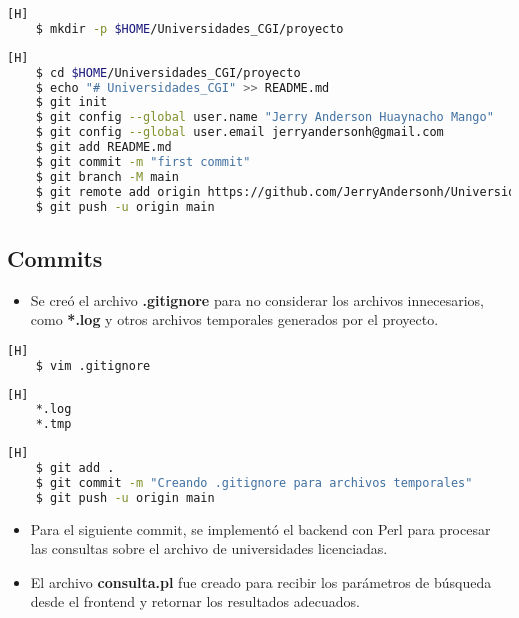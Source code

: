 \documentclass{article}
\begin{document}
    \begin{lstlisting}[language=bash,caption={Creando directorio para el proyecto GitHub}][H]
    $ mkdir -p $HOME/Universidades_CGI/proyecto
    \end{lstlisting}
    
    \begin{lstlisting}[language=bash,caption={Inicializando directorio para el repositorio GitHub}][H]
    $ cd $HOME/Universidades_CGI/proyecto
    $ echo "# Universidades_CGI" >> README.md
    $ git init
    $ git config --global user.name "Jerry Anderson Huaynacho Mango"
    $ git config --global user.email jerryandersonh@gmail.com
    $ git add README.md
    $ git commit -m "first commit"
    $ git branch -M main
    $ git remote add origin https://github.com/JerryAndersonh/Universidades_CGI.git
    $ git push -u origin main
    \end{lstlisting}
    
    \subsection{Commits} 
    \begin{itemize} 
        \item Se creó el archivo \textbf{.gitignore} para no considerar los archivos innecesarios, como \textbf{*.log} y otros archivos temporales generados por el proyecto.
    \end{itemize}
    
    \begin{lstlisting}[language=bash,caption={Creando .gitignore}][H]
    $ vim .gitignore
    \end{lstlisting}
    
    \begin{lstlisting}[language=bash,caption={Contenido de .gitignore}][H]
    *.log
    *.tmp
    \end{lstlisting}
    
    \begin{lstlisting}[language=bash,caption={Commit: Creando .gitignore para archivos temporales}][H]
    $ git add .
    $ git commit -m "Creando .gitignore para archivos temporales"
    $ git push -u origin main
    \end{lstlisting}
    
    \begin{itemize} 
        \item Para el siguiente commit, se implementó el backend con Perl para procesar las consultas sobre el archivo de universidades licenciadas. 
        \item El archivo \textbf{consulta.pl} fue creado para recibir los parámetros de búsqueda desde el frontend y retornar los resultados adecuados.
    \end{itemize}
    
\end{document}
